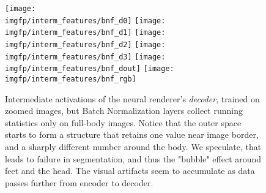 \begin{figure}
	\centering
	\texttt{[image: \\imgfp/interm\_features/bnf\_d0]}%
	\hfill\texttt{[image: \\imgfp/interm\_features/bnf\_d1]}%
	\hfill\texttt{[image: \\imgfp/interm\_features/bnf\_d2]}%
	\hfill\texttt{[image: \\imgfp/interm\_features/bnf\_d3]}%
	\hfill\texttt{[image: \\imgfp/interm\_features/bnf\_dout]}%
	\hfill\texttt{[image: \\imgfp/interm\_features/bnf\_rgb]}%
	\caption{Intermediate activations of the neural renderer's \textit{decoder}, trained on zoomed images, but Batch Normalization layers collect running statistics only on full-body images. Notice that the outer space starts to form a structure that retains one value near image border, and a sharply different number around the body. We speculate, that leads to failure in segmentation, and thus the "bubble" effect around feet and the head. The visual artifacts seem to accumulate as data passes further from encoder to decoder. }
	\label{fig:interm06_decoder}
\end{figure}

